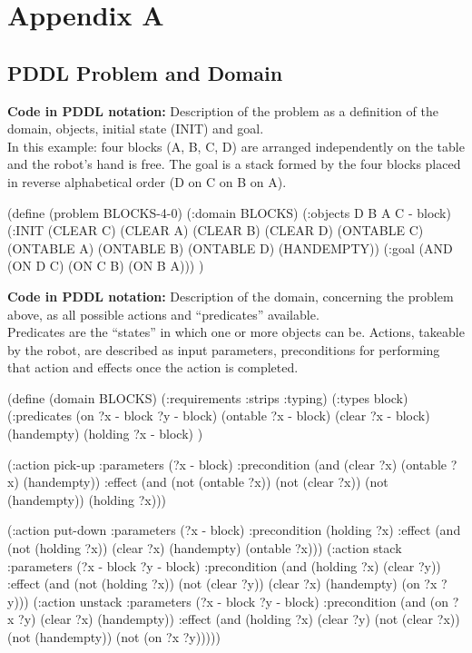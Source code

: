 \chapter{Appendix A} \label{AppendixA}

\section{PDDL Problem and Domain}\label{sec:PDDL} 

\begin{footnotesize}
\textbf{Code in PDDL notation:} Description of the problem as a definition of the domain, objects, initial state (INIT) and goal. \\
In this example: four blocks (A, B, C, D) are arranged independently on the table and the robot's hand is free. The goal is a stack formed by the four blocks placed in reverse alphabetical order (D on C on B on A).
\end{footnotesize}

\begin{python}
(define (problem BLOCKS-4-0)
	(:domain BLOCKS)
	(:objects D B A C - block)
	(:INIT (CLEAR C) (CLEAR A) (CLEAR B) (CLEAR D) 
		(ONTABLE C) (ONTABLE A) (ONTABLE B) 
		(ONTABLE D) (HANDEMPTY))
	(:goal (AND (ON D C) (ON C B) (ON B A)))
)
\end{python}

\bigskip

\begin{footnotesize}
\textbf{Code in PDDL notation:} Description of the domain, concerning the problem above, as all possible actions and \enquote{predicates} available. \\
Predicates are the \enquote{states} in which one or more objects can be. Actions, takeable by the robot, are described as input parameters, preconditions for performing that action and effects once the action is completed. 
\end{footnotesize}

\begin{python}
(define (domain BLOCKS)
  (:requirements :strips :typing)
  (:types block)
  (:predicates (on ?x - block ?y - block)
	       (ontable ?x - block)
	       (clear ?x - block)
	       (handempty)
	       (holding ?x - block)
	       )

  (:action pick-up
	     :parameters (?x - block)
	     :precondition (and (clear ?x) (ontable ?x) 
  			     (handempty))
	     :effect
	     (and (not (ontable ?x))
		   (not (clear ?x))
		   (not (handempty))
		   (holding ?x)))

  (:action put-down
	     :parameters (?x - block)
	     :precondition (holding ?x)
	     :effect
	     (and (not (holding ?x))
		   (clear ?x)
		   (handempty)
		   (ontable ?x)))
  (:action stack
	     :parameters (?x - block ?y - block)
	     :precondition (and (holding ?x) (clear ?y))
	     :effect
	     (and (not (holding ?x))
		   (not (clear ?y))
		   (clear ?x)
		   (handempty)
		   (on ?x ?y)))
  (:action unstack
	     :parameters (?x - block ?y - block)
	     :precondition (and (on ?x ?y) (clear ?x) 
			     (handempty))
	     :effect
	     (and (holding ?x)
		   (clear ?y)
		   (not (clear ?x))
		   (not (handempty))
		   (not (on ?x ?y)))))
\end{python}